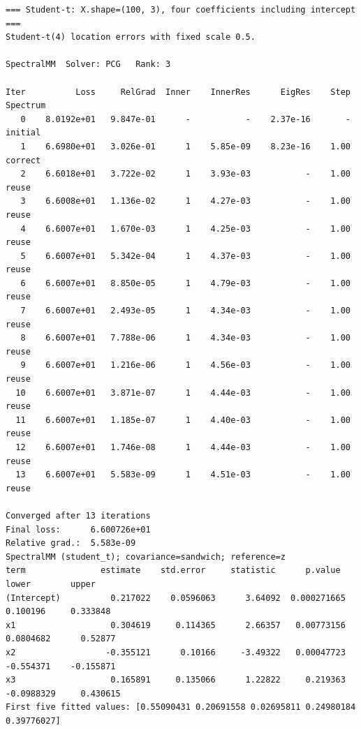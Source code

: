 \documentclass[11pt]{article}
\begin{document}
\begin{lstlisting}
=== Student-t: X.shape=(100, 3), four coefficients including intercept ===
Student-t(4) location errors with fixed scale 0.5.

SpectralMM  Solver: PCG   Rank: 3

Iter          Loss     RelGrad  Inner    InnerRes      EigRes    Step  Spectrum
   0    8.0192e+01   9.847e-01      -           -    2.37e-16       -  initial
   1    6.6980e+01   3.026e-01      1    5.85e-09    8.23e-16    1.00  correct
   2    6.6018e+01   3.722e-02      1    3.93e-03           -    1.00  reuse
   3    6.6008e+01   1.136e-02      1    4.27e-03           -    1.00  reuse
   4    6.6007e+01   1.670e-03      1    4.25e-03           -    1.00  reuse
   5    6.6007e+01   5.342e-04      1    4.37e-03           -    1.00  reuse
   6    6.6007e+01   8.850e-05      1    4.79e-03           -    1.00  reuse
   7    6.6007e+01   2.493e-05      1    4.34e-03           -    1.00  reuse
   8    6.6007e+01   7.788e-06      1    4.34e-03           -    1.00  reuse
   9    6.6007e+01   1.216e-06      1    4.56e-03           -    1.00  reuse
  10    6.6007e+01   3.871e-07      1    4.44e-03           -    1.00  reuse
  11    6.6007e+01   1.185e-07      1    4.40e-03           -    1.00  reuse
  12    6.6007e+01   1.746e-08      1    4.44e-03           -    1.00  reuse
  13    6.6007e+01   5.583e-09      1    4.51e-03           -    1.00  reuse

Converged after 13 iterations
Final loss:      6.600726e+01
Relative grad.:  5.583e-09
SpectralMM (student_t); covariance=sandwich; reference=z
term               estimate    std.error     statistic      p.value        lower        upper
(Intercept)          0.217022    0.0596063      3.64092  0.000271665     0.100196     0.333848
x1                   0.304619     0.114365      2.66357   0.00773156    0.0804682      0.52877
x2                  -0.355121      0.10166     -3.49322   0.00047723    -0.554371    -0.155871
x3                   0.165891     0.135066      1.22822     0.219363   -0.0988329     0.430615
First five fitted values: [0.55090431 0.20691558 0.02695811 0.24980184 0.39776027]

\end{lstlisting}
\end{document}
